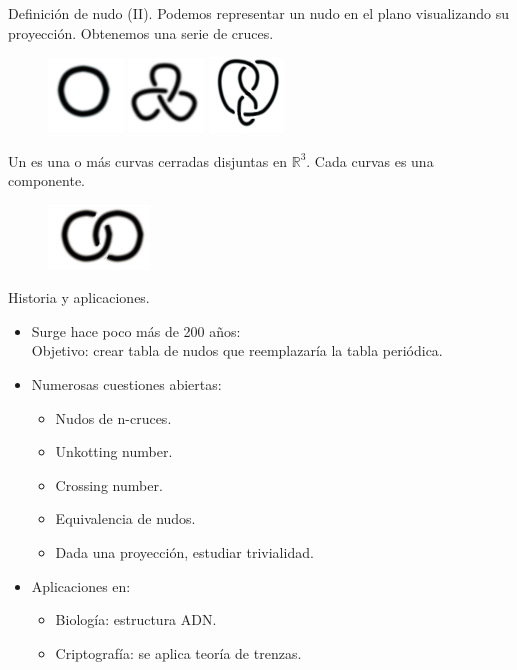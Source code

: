\documentclass{beamer}
\let\emph\relax
\newcommand{\emph}{\alert}
\begin{document}
\begin{frame}{Definición de nudo (II).}
	Podemos representar un nudo en el plano visualizando su proyección. Obtenemos una serie de cruces. 
		 \begin{figure}[h!]
		 	\includegraphics[width=2cm]{imagenes/1.jpg} 
		 	\includegraphics[width=2cm]{imagenes/3f.png}
		 	\includegraphics[width=2cm]{imagenes/fig8.jpg}
		 	\centering 
		 \end{figure}
    \pause
	Un \textbf{\emph{enlace}} es una o más curvas cerradas disjuntas en $\mathds{R}^{3}$. Cada curvas es una componente.
		 \begin{figure}[h!]
		  	\includegraphics[width=2.7cm]{imagenes/enlace.png}
		 \end{figure}
\end{frame}

\begin{frame}{Historia y aplicaciones.}
	\begin{itemize}
		\item Surge hace poco más de 200 años:\\
		Objetivo: crear tabla de nudos que reemplazaría la tabla periódica.
		\item Numerosas cuestiones abiertas:
		\begin{itemize}
			\item Nudos de n-cruces.
			\item Unkotting number.
			\item Crossing number.
			\item Equivalencia de nudos.
			\item Dada una proyección, estudiar trivialidad. 
		\end{itemize}
		\item Aplicaciones en:
		\begin{itemize}
			\item Biología: estructura ADN. 
			\item Criptografía: se aplica teoría de trenzas. 
		\end{itemize}
	\end{itemize}
\end{frame}
\end{document}
